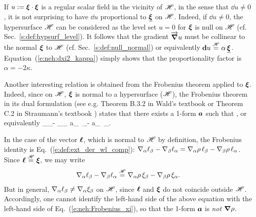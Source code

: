 \begin{remark}
If $u:=\bm{\xi}\cdot\bm{\xi}$ is a regular scalar field in the vicinity of $\mathscr{H}$, in the sense
that $\dd u \neq 0$, it is not surprising to have $\dd u$ proportional
to $\underline{\bm{\xi}}$ on $\mathscr{H}$. Indeed, if $\dd u \neq 0$, the hypersurface $\mathscr{H}$ can be considered
as the level set $u=0$ for $\bm{\xi}$ is null on $\mathscr{H}$ (cf. Sec.~\ref{s:def:hypsurf_level}).
It follows that the gradient $\overrightarrow{\bm{\nabla}} u$ must be collinear to
the normal $\bm{\xi}$ to $\mathscr{H}$ (cf. Sec.~\ref{s:def:null_normal}) or equivalently
$\mathbf{d} u \stackrel{\mathscr{H}}{=} \alpha\, \underline{\bm{\xi}}$. Equation~(\ref{e:neh:dxi2_kappa}) simply shows
that the proportionality factor is $\alpha = -2\kappa$.
\end{remark}

Another interesting relation is obtained from the Frobenius theorem
applied to $\bm{\xi}$. Indeed, since on $\mathscr{H}$, $\bm{\xi}$ is normal to a hypersurface
($\mathscr{H}$), the Frobenius theorem in its dual formulation
(see e.g.
Theorem B.3.2 in Wald's textbook \cite{Wald84} or Theorem C.2 in
Straumann's textbook \cite{Strau13}) states that there exists a 1-form
$\bm{a}$ such that
\be
    \dd \uu{\xi} \equalH {} \wedge \uu{\xi} ,
\ee
or equivalently
\be \label{e:neh:Frobenius_xi}
  \nabla_\alpha \xi_\beta - \nabla_\beta \xi_\alpha \equalH
  a_\alpha \, \xi_\beta -  a_\beta  \, \xi_\alpha  .
\ee

\begin{remark}
In the case of the vector $\bm{\ell}$, which is normal to $\mathscr{H}$ by definition,
the Frobenius identity is
Eq.~(\ref{e:def:ext_der_wl_comp}): $\nabla_\alpha \ell_\beta - \nabla_\beta \ell_\alpha =
  \nabla_\alpha \rho \, \ell_\beta -  \nabla_\beta \rho \, \ell_\alpha$.
Since $\bm{\ell} \stackrel{\mathscr{H}}{=} \bm{\xi}$, we may write
\[
  \nabla_\alpha \ell_\beta - \nabla_\beta \ell_\alpha \stackrel{\mathscr{H}}{=}
  \nabla_\alpha \rho \, \xi_\beta -  \nabla_\beta \rho \, \xi_\alpha .
\]
But in general,  $\nabla_\alpha \ell_\beta \not= \nabla_\alpha \xi_\beta$ on $\mathscr{H}$,
since $\bm{\ell}$ and $\bm{\xi}$ do not coincide outside $\mathscr{H}$. Accordingly, one
cannot identify the left-hand side of the above equation with the left-hand side
of Eq.~(\ref{e:neh:Frobenius_xi}), so that the 1-form $\bm{a}$ is \emph{not} $\bm{\nabla}\rho$.
\end{remark}

